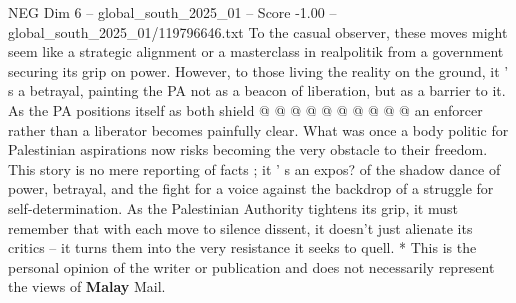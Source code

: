 \begin{textsample}{NEG Dim 6 – global\_south\_2025\_01 – Score -1.00 – global\_south\_2025\_01/119796646.txt}
To the casual observer, these moves might seem like a strategic alignment or a masterclass in realpolitik from a government securing its grip on power.
However, to those living the reality on the ground, it ' s a betrayal, painting the PA not as a beacon of liberation, but as a barrier to it.
As the PA positions itself as both shield @ @ @ @ @ @ @ @ @ @ an enforcer rather than a liberator becomes painfully clear.
What was once a body politic for Palestinian aspirations now risks becoming the very obstacle to their freedom.
This story is no mere reporting of facts ; it ' s an expos? of the shadow dance of power, betrayal, and the fight for a voice against the backdrop of a struggle for self-determination.
As the Palestinian Authority tightens its grip, it must remember that with each move to silence dissent, it doesn't just alienate its critics -- it turns them into the very resistance it seeks to quell. * This is the personal opinion of the writer or publication and does not necessarily represent the views of \textbf{Malay} Mail.

\end{textsample}
